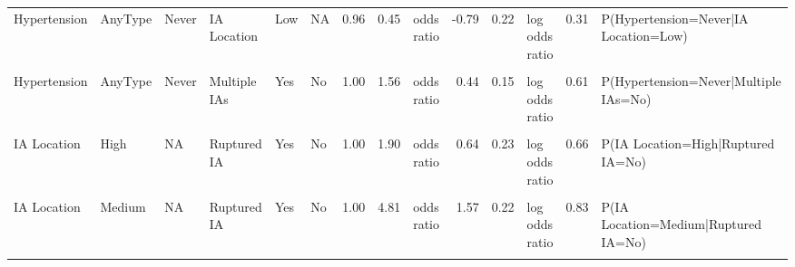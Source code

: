 \begin{landscape}
\begin{table}[!h]
{\begin{tabular}[t]{llllllrrlrrlrl}
Hypertension & AnyType & Never & IA Location & Low & NA & 0.96 & 0.45 & odds ratio & -0.79 & 0.22 & log odds ratio & 0.31 & P(Hypertension=Never|IA Location=Low)\\
\cellcolor{gray!6}{Hypertension} & \cellcolor{gray!6}{AnyType} & \cellcolor{gray!6}{Never} & \cellcolor{gray!6}{IA Location} & \cellcolor{gray!6}{Medium} & \cellcolor{gray!6}{NA} & \cellcolor{gray!6}{0.96} & \cellcolor{gray!6}{1.34} & \cellcolor{gray!6}{odds ratio} & \cellcolor{gray!6}{0.29} & \cellcolor{gray!6}{0.17} & \cellcolor{gray!6}{log odds ratio} & \cellcolor{gray!6}{0.57} & \cellcolor{gray!6}{P(Hypertension=Never|IA Location=Medium)}\\
Hypertension & AnyType & Never & Multiple IAs & Yes & No & 1.00 & 1.56 & odds ratio & 0.44 & 0.15 & log odds ratio & 0.61 & P(Hypertension=Never|Multiple IAs=No)\\
\cellcolor{gray!6}{Hypertension} & \cellcolor{gray!6}{intercept} & \cellcolor{gray!6}{NA} & \cellcolor{gray!6}{NA} & \cellcolor{gray!6}{NA} & \cellcolor{gray!6}{NA} & \cellcolor{gray!6}{NA} & \cellcolor{gray!6}{1.86} & \cellcolor{gray!6}{odds ratio} & \cellcolor{gray!6}{0.62} & \cellcolor{gray!6}{0.09} & \cellcolor{gray!6}{log odds ratio} & \cellcolor{gray!6}{0.65} & \cellcolor{gray!6}{P(Hypertension=Never)}\\
\addlinespace
IA Location & High & NA & Ruptured IA & Yes & No & 1.00 & 1.90 & odds ratio & 0.64 & 0.23 & log odds ratio & 0.66 & P(IA Location=High|Ruptured IA=No)\\
\cellcolor{gray!6}{IA Location} & \cellcolor{gray!6}{Low} & \cellcolor{gray!6}{NA} & \cellcolor{gray!6}{Ruptured IA} & \cellcolor{gray!6}{Yes} & \cellcolor{gray!6}{No} & \cellcolor{gray!6}{1.00} & \cellcolor{gray!6}{41.03} & \cellcolor{gray!6}{odds ratio} & \cellcolor{gray!6}{3.71} & \cellcolor{gray!6}{0.39} & \cellcolor{gray!6}{log odds ratio} & \cellcolor{gray!6}{0.98} & \cellcolor{gray!6}{P(IA Location=Low|Ruptured IA=No)}\\
IA Location & Medium & NA & Ruptured IA & Yes & No & 1.00 & 4.81 & odds ratio & 1.57 & 0.22 & log odds ratio & 0.83 & P(IA Location=Medium|Ruptured IA=No)\\
\addlinespace
\cellcolor{gray!6}{IA Location=Low risk} & \cellcolor{gray!6}{intercept} & \cellcolor{gray!6}{NA} & \cellcolor{gray!6}{NA} & \cellcolor{gray!6}{NA} & \cellcolor{gray!6}{NA} & \cellcolor{gray!6}{NA} & \cellcolor{gray!6}{0.76} & \cellcolor{gray!6}{odds ratio} & \cellcolor{gray!6}{-0.27} & \cellcolor{gray!6}{0.25} & \cellcolor{gray!6}{log odds ratio} & \cellcolor{gray!6}{0.43} & \cellcolor{gray!6}{P(IA Location=Low risk)}\\

\end{tabular}}
\end{table}
\end{landscape}
